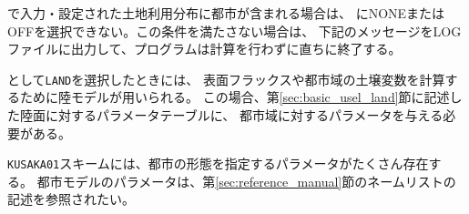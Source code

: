 で入力・設定された土地利用分布に都市が含まれる場合は、
にNONEまたはOFFを選択できない。この条件を満たさない場合は、
下記のメッセージをLOGファイルに出力して、プログラムは計算を行わずに直ちに終了する。
%

として\verb|LAND|を選択したときには、
表面フラックスや都市域の土壌変数を計算するために陸モデルが用いられる。
この場合、第\ref{sec:basic_usel_land}節に記述した陸面に対するパラメータテーブルに、
都市域に対するパラメータを与える必要がある。

\verb|KUSAKA01|スキームには、都市の形態を指定するパラメータがたくさん存在する。
都市モデルのパラメータは、第\ref{sec:reference_manual}節のネームリストの記述を参照されたい。
